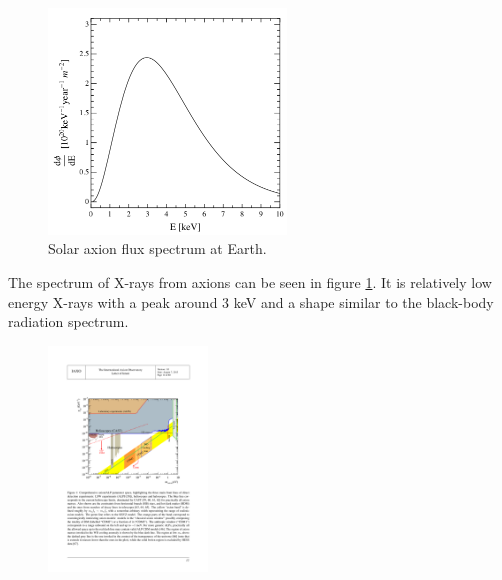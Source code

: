 \begin{figure}[htbp]
  \centering
    \includegraphics[height=6cm]{figures/cast/axion_spectrum.png}
  \caption{Solar axion flux spectrum at Earth. }
  \label{fig:axion_spectrum}
\end{figure}

The spectrum of X-rays from axions can be seen in figure \ref{fig:axion_spectrum}. It is relatively low energy X-rays with a peak around 3 keV and a shape similar to the black-body radiation spectrum.

\begin{figure}[htbp]
  \centering
    \includegraphics[height=6cm]{figures/cast/axion_search_cast2.pdf}
  \caption{}
  \label{fig:axion_search_cast}
\end{figure}

